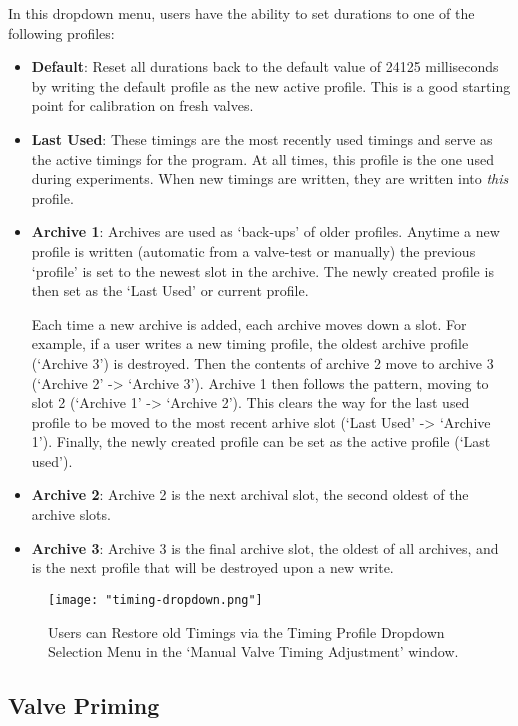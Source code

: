 \documentclass{article}
\begin{document}
In this dropdown menu, users have the ability to set durations to one of the following profiles:
\begin{itemize}
    \item \textbf{Default}: Reset all durations back to the default value of 24125 milliseconds by writing the default profile as the new active
        profile. This is a good starting point for calibration on fresh valves.  
    \item \textbf{Last Used}: These timings are the most recently used timings and serve as the active timings for the program. At all times, 
        this profile is the one used during experiments. When new timings are written, they are written into \textit{this} profile.
    \item \textbf{Archive 1}: Archives are used as `back-ups' of older profiles. Anytime a new profile is written (automatic from a valve-test
        or manually) the previous `profile' is set to the newest slot in the archive. The newly created profile is then set as the `Last Used' 
        or current profile. 

        Each time a new archive is added, each archive moves down a slot. For example, if a user writes a new timing 
        profile, the oldest archive profile (`Archive 3') is destroyed. Then the contents of archive 2 move to archive 3 
        (`Archive 2' -> `Archive 3'). Archive 1 then follows the pattern, moving to slot 2 (`Archive 1' -> `Archive 2'). This clears the way
        for the last used profile to be moved to the most recent arhive slot (`Last Used' -> `Archive 1'). Finally, the newly created profile 
        can be set as the active profile (`Last used'). 
    \item \textbf{Archive 2}: Archive 2 is the next archival slot, the second oldest of the archive slots.
    \item \textbf{Archive 3}: Archive 3 is the final archive slot, the oldest of all archives, and is the next profile that will be destroyed 
        upon a new write.
\end{itemize}

\begin{figure}[h!]
    \centering
    \texttt{[image: "timing-dropdown.png"]}
    \caption{Users can Restore old Timings via the Timing Profile Dropdown Selection Menu in the `Manual Valve Timing Adjustment' window.}
    \label{fig:timing-dropdown}
\end{figure}
\FloatBarrier

\clearpage
\subsection{Valve Priming}
\end{document}
